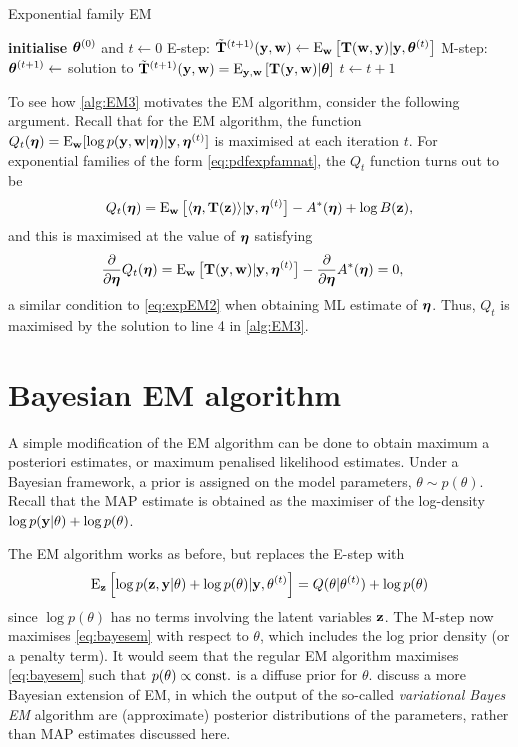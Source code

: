\begin{algorithm}[hbt]
\caption{Exponential family EM}\label{alg:EM3}
\begin{algorithmic}[1]
  \State \textbf{initialise} ${\bm\theta}^{(0)}$ and $t\gets 0$
    \State E-step: $\tilde{{\mathbf T}}^{(t+1)}({\mathbf y},{\mathbf w}) \gets \operatorname{E}_{\mathbf w} \big[ {\mathbf T}({\mathbf w},{\mathbf y}) | {\mathbf y}, {\bm\theta}^{(t)} \big]$
    \State M-step: ${\bm\theta}^{(t+1)} \gets$ solution to $\tilde{{\mathbf T}}^{(t+1)}({\mathbf y},{\mathbf w}) = \operatorname{E}_{{\mathbf y},{\mathbf w}}\left[ {\mathbf T}({\mathbf y},{\mathbf w}) | {\bm\theta} \right]$
    \State $t \gets t + 1$
  \EndWhile
\end{algorithmic}
\end{algorithm}

To see how \cref{alg:EM3} motivates the EM algorithm, consider the following argument.
Recall that for the EM algorithm, the function $Q_t({\bm\eta}) = \operatorname{E}_{\mathbf w}[\log p({\mathbf y},{\mathbf w}|{\bm\eta}) | {\mathbf y},{\bm\eta}^{(t)}]$ is maximised at each iteration $t$.
For exponential families of the form \cref{eq:pdfexpfamnat}, the $Q_t$ function turns out to be
\[
 Q_t({\bm\eta}) = \operatorname{E}_{\mathbf w} \big[ \langle{\bm\eta}, {\mathbf T}({\mathbf z})\rangle | {\mathbf y},{\bm\eta}^{(t)} \big] -  A^*({\bm\eta}) + \log B({\mathbf z}),
\]
and this is maximised at the value of ${\bm\eta}$ satisfying
\begin{align*}
  \frac{\partial}{\partial{\bm\eta}} Q_t({\bm\eta})
  &= \operatorname{E}_{\mathbf w} \big[ {\mathbf T}({\mathbf y},{\mathbf w}) | {\mathbf y},{\bm\eta}^{(t)} \big] - \frac{\partial}{\partial{\bm\eta}}A^*({\bm\eta}) = 0,
\end{align*}
a similar condition to \cref{eq:expEM2} when obtaining ML estimate of ${\bm\eta}$.
Thus, $Q_t$ is maximised by the solution to line 4 in  \cref{alg:EM3}.

\section{Bayesian EM algorithm}

A simple modification of the EM algorithm can be done to obtain maximum a posteriori estimates, or maximum penalised likelihood estimates.
Under a Bayesian framework, a prior is assigned on the model parameters, $\theta\sim p(\theta)$.
Recall that the MAP estimate is obtained as the maximiser of the log-density $\log p({\mathbf y}|\theta) + \log p(\theta)$.

The EM algorithm works as before, but replaces the E-step with 
\begin{equation}\label{eq:bayesem}
  \operatorname{E}_{\mathbf z} \left[\log p({\mathbf z},{\mathbf y}|\theta) + \log p(\theta) | {\mathbf y}, \theta^{(t)} \right]
  = Q(\theta|\theta^{(t)}) + \log p(\theta)
\end{equation}
since $\log p(\theta)$ has no terms involving the latent variables ${\mathbf z}$.
The M-step now maximises \cref{eq:bayesem} with respect to $\theta$, which includes the log prior density (or a penalty term).
It would seem that the regular EM algorithm maximises \cref{eq:bayesem} such that $p(\theta) \propto \text{const.}\hspace{0.01em}$ is a diffuse prior for $\theta$.
\citet{beal2003} discuss a more Bayesian extension of EM, in which the output of the so-called \emph{variational Bayes EM} algorithm are (approximate) posterior distributions of the parameters, rather than MAP estimates discussed here.

